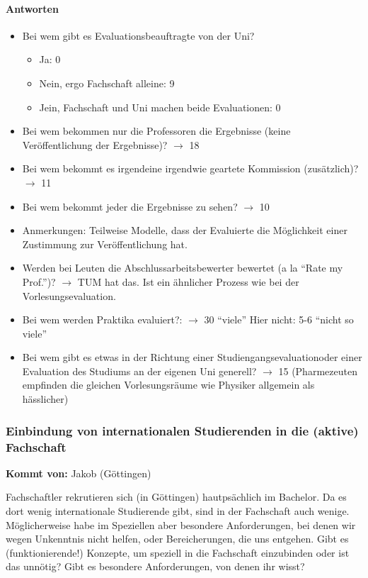       \paragraph{Antworten}
        \begin{itemize}
          \item Bei wem gibt es Evaluationsbeauftragte von der Uni?
            \begin{itemize}
              \item Ja: 0
              \item Nein, ergo Fachschaft alleine: 9
              \item Jein, Fachschaft und Uni machen beide Evaluationen: 0
            \end{itemize}
          \item Bei wem bekommen nur die Professoren die Ergebnisse (keine Veröffentlichung der Ergebnisse)? $\rightarrow$ 18
          \item Bei wem bekommt es irgendeine irgendwie geartete Kommission (zusätzlich)? $\rightarrow$ 11
          \item Bei wem bekommt jeder die Ergebnisse zu sehen? $\rightarrow$ 10
          \item Anmerkungen: Teilweise Modelle, dass der Evaluierte die Möglichkeit einer Zustimmung zur Veröffentlichung hat.
          \item Werden bei Leuten die Abschlussarbeitsbewerter bewertet (a la “Rate my Prof.”)?
            $\rightarrow$ TUM hat das. Ist ein ähnlicher Prozess wie bei der Vorlesungsevaluation.
          \item Bei wem werden Praktika evaluiert?: $\rightarrow$ 30 “viele”
            Hier nicht: 5-6 “nicht so viele”
          \item Bei wem gibt es etwas in der Richtung einer \flqq Studiengangsevaluation\frqq oder einer Evaluation des Studiums an der eigenen Uni generell? $\rightarrow$ 15 (Pharmezeuten empfinden die gleichen Vorlesungsräume wie Physiker allgemein als hässlicher)
        \end{itemize}

    \subsubsection*{Einbindung von internationalen Studierenden in die (aktive) Fachschaft}
      \textbf{Kommt von:} Jakob (Göttingen)

      Fachschaftler rekrutieren sich (in Göttingen) hautpsächlich im Bachelor. Da es dort wenig internationale Studierende gibt, sind in der Fachschaft auch wenige. Möglicherweise habe im Speziellen aber besondere Anforderungen, bei denen wir wegen Unkenntnis nicht helfen, oder Bereicherungen, die uns entgehen. Gibt es (funktionierende!) Konzepte, um speziell in die Fachschaft einzubinden oder ist das unnötig?
      Gibt es besondere Anforderungen, von denen ihr wisst?

